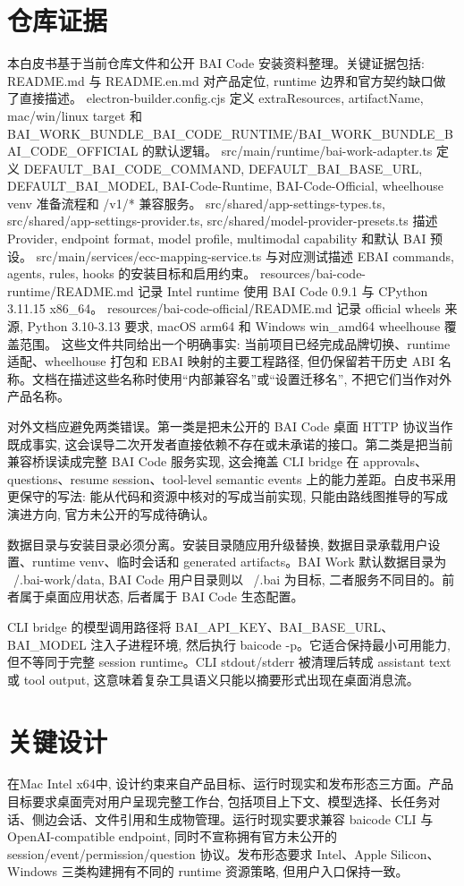 \section{仓库证据}
本白皮书基于当前仓库文件和公开 BAI Code 安装资料整理。关键证据包括: README.md 与 README.en.md 对产品定位, runtime 边界和官方契约缺口做了直接描述。 electron-builder.config.cjs 定义 extraResources, artifactName, mac/win/linux target 和 BAI\_WORK\_BUNDLE\_BAI\_CODE\_RUNTIME/BAI\_WORK\_BUNDLE\_BAI\_CODE\_OFFICIAL 的默认逻辑。 src/main/runtime/bai-work-adapter.ts 定义 DEFAULT\_BAI\_CODE\_COMMAND, DEFAULT\_BAI\_BASE\_URL, DEFAULT\_BAI\_MODEL, BAI-Code-Runtime, BAI-Code-Official, wheelhouse venv 准备流程和 /v1/* 兼容服务。 src/shared/app-settings-types.ts, src/shared/app-settings-provider.ts, src/shared/model-provider-presets.ts 描述 Provider, endpoint format, model profile, multimodal capability 和默认 BAI 预设。 src/main/services/ecc-mapping-service.ts 与对应测试描述 EBAI commands, agents, rules, hooks 的安装目标和启用约束。 resources/bai-code-runtime/README.md 记录 Intel runtime 使用 BAI Code 0.9.1 与 CPython 3.11.15 x86\_64。 resources/bai-code-official/README.md 记录 official wheels 来源, Python 3.10-3.13 要求, macOS arm64 和 Windows win\_amd64 wheelhouse 覆盖范围。 这些文件共同给出一个明确事实: 当前项目已经完成品牌切换、runtime 适配、wheelhouse 打包和 EBAI 映射的主要工程路径, 但仍保留若干历史 ABI 名称。文档在描述这些名称时使用“内部兼容名”或“设置迁移名”, 不把它们当作对外产品名称。

对外文档应避免两类错误。第一类是把未公开的 BAI Code 桌面 HTTP 协议当作既成事实, 这会误导二次开发者直接依赖不存在或未承诺的接口。第二类是把当前兼容桥误读成完整 BAI Code 服务实现, 这会掩盖 CLI bridge 在 approvals、questions、resume session、tool-level semantic events 上的能力差距。白皮书采用更保守的写法: 能从代码和资源中核对的写成当前实现, 只能由路线图推导的写成演进方向, 官方未公开的写成待确认。

数据目录与安装目录必须分离。安装目录随应用升级替换, 数据目录承载用户设置、runtime venv、临时会话和 generated artifacts。BAI Work 默认数据目录为 ~/.bai-work/data, BAI Code 用户目录则以 ~/.bai 为目标, 二者服务不同目的。前者属于桌面应用状态, 后者属于 BAI Code 生态配置。

CLI bridge 的模型调用路径将 BAI\_API\_KEY、BAI\_BASE\_URL、BAI\_MODEL 注入子进程环境, 然后执行 baicode -p。它适合保持最小可用能力, 但不等同于完整 session runtime。CLI stdout/stderr 被清理后转成 assistant text 或 tool output, 这意味着复杂工具语义只能以摘要形式出现在桌面消息流。

\section{关键设计}
在Mac Intel x64中, 设计约束来自产品目标、运行时现实和发布形态三方面。产品目标要求桌面壳对用户呈现完整工作台, 包括项目上下文、模型选择、长任务对话、侧边会话、文件引用和生成物管理。运行时现实要求兼容 baicode CLI 与 OpenAI-compatible endpoint, 同时不宣称拥有官方未公开的 session/event/permission/question 协议。发布形态要求 Intel、Apple Silicon、Windows 三类构建拥有不同的 runtime 资源策略, 但用户入口保持一致。

